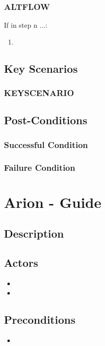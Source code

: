 \documentclass{scrreprt}
\begin{document}
    \subsection{ALTFLOW}
    If in step n ...:
    \begin{enumerate}
        \item 
    \end{enumerate}

\section{Key Scenarios}
    \subsection{KEYSCENARIO}

\section{Post-Conditions}
    \subsection{Successful Condition}
    
    \subsection{Failure Condition}


\chapter{Arion - Guide}

\section{Description}

\section{Actors}
\begin{itemize}
    \item 
    \item 
\end{itemize}

\section{Preconditions}
\begin{itemize}
    \item 
\end{itemize}
\end{document}

